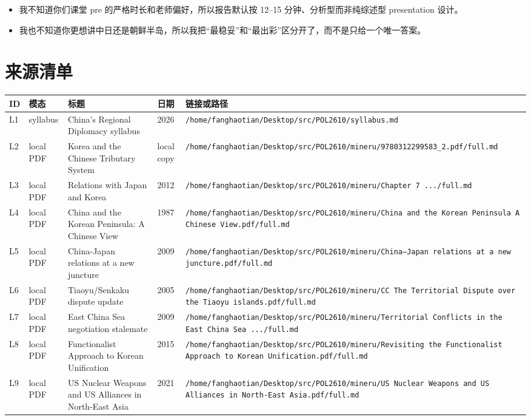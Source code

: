 \documentclass[a4paper]{article}
\begin{document}
\begin{itemize}
\item 我不知道你们课堂 pre 的严格时长和老师偏好，所以报告默认按 12--15 分钟、分析型而非纯综述型 presentation 设计。
\item 我也不知道你更想讲中日还是朝鲜半岛，所以我把``最稳妥''和``最出彩''区分开了，而不是只给一个唯一答案。
\end{itemize}

\appendix

\section{来源清单}
\small
\begin{longtable}{p{1.0cm}p{1.6cm}p{4.2cm}p{2.2cm}p{6.0cm}}
\toprule
\textbf{ID} & \textbf{模态} & \textbf{标题} & \textbf{日期} & \textbf{链接或路径} \\
\midrule
\endhead
L1 & syllabus & China's Regional Diplomacy syllabus & 2026 & \texttt{/home/fanghaotian/Desktop/src/POL2610/syllabus.md} \\
L2 & local PDF & Korea and the Chinese Tributary System & local copy & \texttt{/home/fanghaotian/Desktop/src/POL2610/mineru/9780312299583\_2.pdf/full.md} \\
L3 & local PDF & Relations with Japan and Korea & 2012 & \texttt{/home/fanghaotian/Desktop/src/POL2610/mineru/Chapter 7 .../full.md} \\
L4 & local PDF & China and the Korean Peninsula: A Chinese View & 1987 & \texttt{/home/fanghaotian/Desktop/src/POL2610/mineru/China and the Korean Peninsula A Chinese View.pdf/full.md} \\
L5 & local PDF & China-Japan relations at a new juncture & 2009 & \texttt{/home/fanghaotian/Desktop/src/POL2610/mineru/China--Japan relations at a new juncture.pdf/full.md} \\
L6 & local PDF & Tiaoyu/Senkaku dispute update & 2005 & \texttt{/home/fanghaotian/Desktop/src/POL2610/mineru/CC The Territorial Dispute over the Tiaoyu islands.pdf/full.md} \\
L7 & local PDF & East China Sea negotiation stalemate & 2009 & \texttt{/home/fanghaotian/Desktop/src/POL2610/mineru/Territorial Conflicts in the East China Sea .../full.md} \\
L8 & local PDF & Functionalist Approach to Korean Unification & 2015 & \texttt{/home/fanghaotian/Desktop/src/POL2610/mineru/Revisiting the Functionalist Approach to Korean Unification.pdf/full.md} \\
L9 & local PDF & US Nuclear Weapons and US Alliances in North-East Asia & 2021 & \texttt{/home/fanghaotian/Desktop/src/POL2610/mineru/US Nuclear Weapons and US Alliances in North-East Asia.pdf/full.md} \\

\end{longtable}
\end{document}

